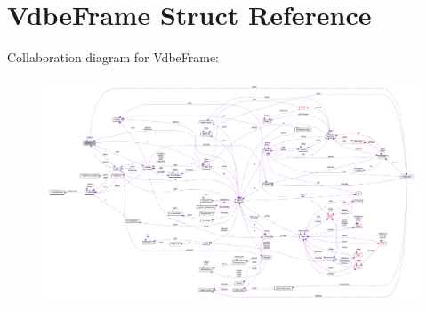 \hypertarget{struct_vdbe_frame}{\section{Vdbe\-Frame Struct Reference}
\label{struct_vdbe_frame}
}


Collaboration diagram for Vdbe\-Frame\-:\nopagebreak
\begin{figure}[H]
\begin{center}
\leavevmode
\includegraphics[width=350pt]{struct_vdbe_frame__coll__graph}
\end{center}
\end{figure}

